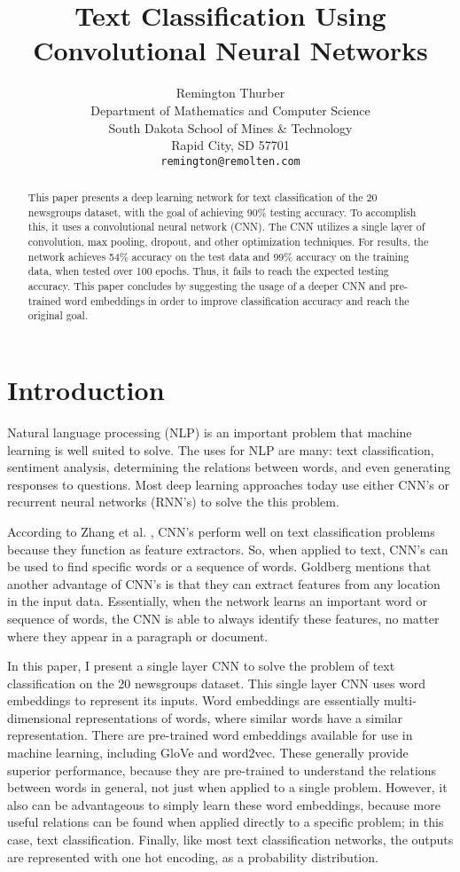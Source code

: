 \documentclass{article}
\title{Text Classification Using Convolutional Neural Networks}
\author{
Remington Thurber \\
Department of Mathematics and Computer Science \\
South Dakota School of Mines & Technology \\
Rapid City, SD 57701 \\
\texttt{remington@remolten.com} \\
}
\begin{document}
\maketitle

\begin{abstract}
This paper presents a deep learning network for text classification of the 20 newsgroups dataset, with the goal of achieving
90\% testing accuracy. To accomplish this, it uses a convolutional
neural network (CNN). The CNN utilizes a single layer of convolution, max pooling, dropout, and other optimization techniques.
For results, the network achieves 54\% accuracy on the test data and 99\% accuracy on the training data, when tested over 100 epochs.
Thus, it fails to reach the expected testing accuracy.
This paper concludes by suggesting the usage of a deeper CNN and pre-trained word embeddings in order to improve classification accuracy
and reach the original goal.
\end{abstract}

\section{Introduction}
Natural language processing (NLP) is an important problem that machine learning is well suited to solve. The uses for NLP are many:
text classification, sentiment analysis, determining the relations between words, and even generating responses to questions.
Most deep learning approaches today use either CNN's or recurrent neural networks (RNN's) to solve the this problem.

According to Zhang et al. \cite{zhang}, CNN's perform well on text classification problems because they function as feature extractors. So, when
applied to text, CNN's can be used to find specific words or a sequence of words. Goldberg \cite{goldberg} mentions that another advantage of CNN's is that they can extract features
from any location in the input data. Essentially, when the network learns an important word or sequence of words, the CNN is able to always
identify these features, no matter where they appear in a paragraph or document.

In this paper, I present a single layer CNN to solve the problem of text classification on the 20 newsgroups dataset. This single layer CNN
uses word embeddings to represent its inputs. Word embeddings are essentially multi-dimensional representations of
words, where similar words have a similar representation. There are pre-trained word embeddings available for use in machine learning,
including GloVe and word2vec. These generally provide superior performance, because they are pre-trained to understand the relations
between words in general, not just when applied to a single problem. However, it also can be advantageous to simply learn these word
embeddings, because more useful relations can be found when applied directly to a specific problem; in this case, text classification.
Finally, like most text classification networks, the outputs are represented with one hot encoding, as a probability distribution.
\end{document}
